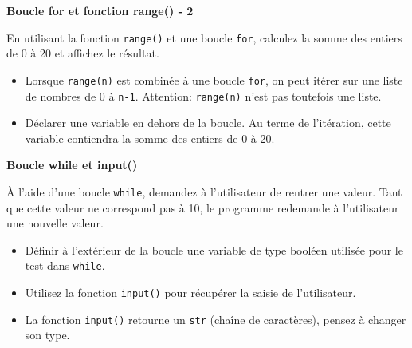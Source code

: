     \begin{Exercice}[5 minutes] [Python] \textbf{Boucle for et fonction range() - 2}
      	
      	En utilisant la fonction \lstinline{range()} et une boucle \lstinline{for}, calculez la somme des entiers de 0 à 20 et affichez le résultat.
    
        \begin{conseil}
           \begin{itemize}
           	\item Lorsque \lstinline{range(n)} est combinée à une boucle \lstinline{for}, on peut itérer sur une liste de nombres de 0 à \texttt{n-1}. Attention: \lstinline{range(n)} n'est pas toutefois une liste.
           	\item Déclarer une variable en dehors de la boucle. Au terme de l'itération, cette variable contiendra la somme des entiers de 0 à 20.
           \end{itemize}
		     
        \end{conseil}
        
        \begin{solution}
            
        \end{solution}
    \end{Exercice}

    
 \begin{Exercice}[10 minutes] [Python] \textbf{Boucle while et input()}
      	
      	À l'aide d'une boucle \lstinline{while}, demandez à l'utilisateur de rentrer une valeur. Tant que cette valeur ne correspond pas à 10, le programme redemande à l'utilisateur une nouvelle valeur.
    
        \begin{conseil}
           \begin{itemize}
           	\item Définir à l'extérieur de la boucle une variable de type booléen utilisée pour le test dans \lstinline{while}.
           	\item Utilisez la fonction \lstinline{input()} pour récupérer la saisie de l'utilisateur.
           	\item La fonction \lstinline{input()} retourne un \lstinline{str} (chaîne de caractères), pensez à changer son type.
           \end{itemize}
		     
        \end{conseil}
        
        \begin{solution}
            
        \end{solution}
    \end{Exercice}


